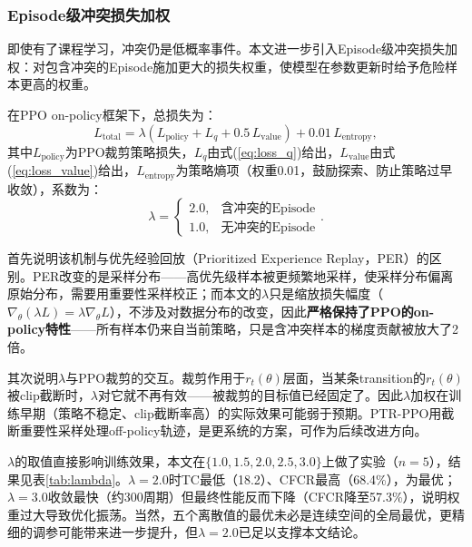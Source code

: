 \documentclass[12pt,a4paper,UTF8]{ctexart}
\begin{document}
\subsubsection{Episode级冲突损失加权}

即使有了课程学习，冲突仍是低概率事件。本文进一步引入Episode级冲突损失加权：对包含冲突的Episode施加更大的损失权重，使模型在参数更新时给予危险样本更高的权重。

在PPO\cite{ref30} on-policy框架下，总损失为：
\begin{equation}
    L_{\text{total}} = \lambda\left(L_{\text{policy}} + L_{q} + 0.5\,L_{\text{value}}\right) + 0.01\,L_{\text{entropy}},
    \label{eq:total_loss}
\end{equation}
其中$L_{\text{policy}}$为PPO裁剪策略损失，$L_{q}$由式(\ref{eq:loss_q})给出，$L_{\text{value}}$由式(\ref{eq:loss_value})给出，$L_{\text{entropy}}$为策略熵项（权重0.01，鼓励探索、防止策略过早收敛），系数为：
\begin{equation}
    \lambda = \begin{cases}
        2.0, & \text{含冲突的Episode}\\
        1.0, & \text{无冲突的Episode}
    \end{cases}.
    \label{eq:lambda}
\end{equation}

首先说明该机制与优先经验回放（Prioritized Experience Replay，PER）的区别。PER改变的是采样分布——高优先级样本被更频繁地采样，使采样分布偏离原始分布，需要用重要性采样校正；而本文的$\lambda$只是缩放损失幅度（$\nabla_\theta(\lambda L)=\lambda\nabla_\theta L$），不涉及对数据分布的改变，因此\textbf{严格保持了PPO的on-policy特性}——所有样本仍来自当前策略，只是含冲突样本的梯度贡献被放大了2倍。

其次说明$\lambda$与PPO裁剪的交互。裁剪作用于$r_t(\theta)$层面，当某条transition的$r_t(\theta)$被clip截断时，$\lambda$对它就不再有效——被裁剪的目标值已经固定了。因此$\lambda$加权在训练早期（策略不稳定、clip截断率高）的实际效果可能弱于预期。PTR-PPO\cite{ref27}用截断重要性采样处理off-policy轨迹，是更系统的方案，可作为后续改进方向。

$\lambda$的取值直接影响训练效果，本文在$\{1.0, 1.5, 2.0, 2.5, 3.0\}$上做了实验（$n=5$），结果见表\ref{tab:lambda}。$\lambda=2.0$时TC最低（18.2）、CFCR最高（68.4\%），为最优；$\lambda=3.0$收敛最快（约300周期）但最终性能反而下降（CFCR降至57.3\%），说明权重过大导致优化振荡。当然，五个离散值的最优未必是连续空间的全局最优，更精细的调参可能带来进一步提升，但$\lambda=2.0$已足以支撑本文结论。
\end{document}
